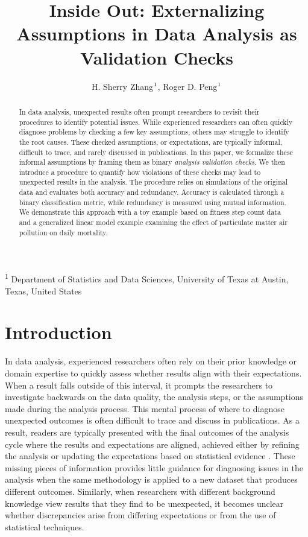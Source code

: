 \documentclass[
  12pt,
]{interact}
\title{Inside Out: Externalizing Assumptions in Data Analysis as
Validation Checks}
\author{H. Sherry Zhang$\textsuperscript{1}$, Roger D.
Peng$\textsuperscript{1}$}
\begin{document}
\captionsetup{labelsep=space}
\maketitle
\textsuperscript{1} Department of Statistics and Data
Sciences, University of Texas at Austin, Texas, United States
\begin{abstract}
In data analysis, unexpected results often prompt researchers to revisit
their procedures to identify potential issues. While experienced
researchers can often quickly diagnose problems by checking a few key
assumptions, others may struggle to identify the root causes. These
checked assumptions, or expectations, are typically informal, difficult
to trace, and rarely discussed in publications. In this paper, we
formalize these informal assumptions by framing them as binary
\emph{analysis validation checks}. We then introduce a procedure to
quantify how violations of these checks may lead to unexpected results
in the analysis. The procedure relies on simulations of the original
data and evaluates both accuracy and redundancy. Accuracy is calculated
through a binary classification metric, while redundancy is measured
using mutual information. We demonstrate this approach with a toy
example based on fitness step count data and a generalized linear model
example examining the effect of particulate matter air pollution on
daily mortality.
\end{abstract}


\section{Introduction}\label{introduction}

In data analysis, experienced researchers often rely on their prior
knowledge or domain expertise to quickly assess whether results align
with their expectations. When a result falls outside of this interval,
it prompts the researchers to investigate backwards on the data quality,
the analysis steps, or the assumptions made during the analysis process.
This mental process of where to diagnose unexpected outcomes is often
difficult to trace and discuss in publications. As a result, readers are
typically presented with the final outcomes of the analysis cycle where
the results and expectations are aligned, achieved either by refining
the analysis or updating the expectations based on statistical evidence
\citep{grolemund_cognitive_2014}. These missing pieces of information
provides little guidance for diagnosing issues in the analysis when the
same methodology is applied to a new dataset that produces different
outcomes. Similarly, when researchers with different background
knowledge view results that they find to be unexpected, it becomes
unclear whether discrepancies arise from differing expectations or from
the use of statistical techniques.
\end{document}
